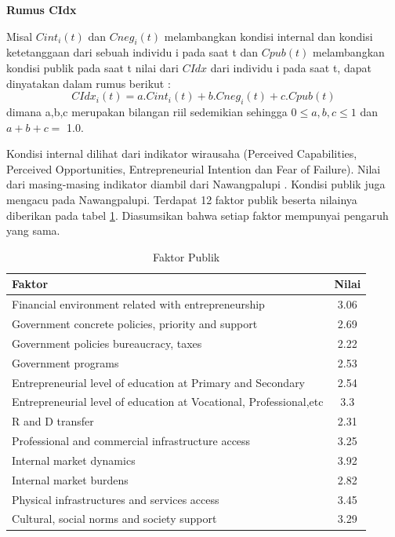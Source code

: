 \documentclass[a4paper,twoside]{article}
\begin{document}
\begin{enumerate}
\begin{enumerate}


\textbf{Rumus CIdx}


Misal $Cint_{i}(t)$ dan $Cneg_{i}(t)$ melambangkan kondisi internal dan kondisi ketetanggaan dari sebuah individu i pada saat t dan $Cpub(t)$ melambangkan kondisi publik pada saat t nilai dari $CIdx$ dari individu i pada saat t, dapat dinyatakan dalam rumus berikut :
\begin{displaymath}
	CIdx_{i}(t) = a.Cint_{i}(t) + b.Cneg_{i}(t) + c.Cpub(t)
\end{displaymath}
dimana a,b,c merupakan bilangan riil sedemikian sehingga $0\leq a,b,c \leq 1$ dan $a+b+c=$ 1.0.

Kondisi internal dilihat dari indikator wirausaha (Perceived Capabilities, Perceived Opportunities, Entrepreneurial Intention dan Fear of Failure). Nilai dari masing-masing indikator diambil dari Nawangpalupi \footnotemark. Kondisi publik juga mengacu pada Nawangpalupi. Terdapat 12 faktor publik beserta nilainya diberikan pada tabel \ref{tabelFaktorPublik}. Diasumsikan bahwa setiap faktor mempunyai pengaruh yang sama.



\begin{table} [H]
\centering
\caption{Faktor Publik}
\begin{tabular}{|p{8cm}|c|}
\hline
Faktor & Nilai\\
\hline
Financial environment related with entrepreneurship & 3.06\\
\hline
Government concrete policies, priority and support & 2.69\\
\hline
Government policies bureaucracy, taxes & 2.22\\
\hline
Government programs & 2.53\\
\hline
Entrepreneurial level of education at Primary and Secondary & 2.54\\
\hline
Entrepreneurial level of education at Vocational, Professional,etc & 3.3\\
\hline
R and D transfer & 2.31\\
\hline
Professional and commercial infrastructure access & 3.25\\
\hline
Internal market dynamics & 3.92\\
\hline
Internal market burdens & 2.82\\
\hline
Physical infrastructures and services access & 3.45\\
\hline
Cultural, social norms and society support & 3.29\\
\hline
\end{tabular}
\label{tabelFaktorPublik}
\end{table}
	

\end{enumerate}
\end{enumerate}
\end{document}
